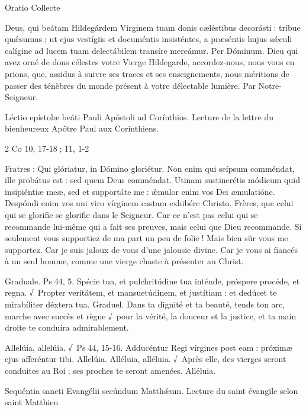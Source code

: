 \begin{paracol}{2}
Oratio
\switchcolumn
Collecte
\switchcolumn*

Deus, qui beátam Hildegárdem  Vírginem tuam donis cæléstibus decorásti : tríbue quǽsumus ; ut ejus vestígiis et documéntis insisténtes, a præséntis hujus sǽculi calígine ad lucem tuam delectábilem transíre mereámur. Per Dóminum.
\switchcolumn
Dieu qui avez orné de dons célestes  votre Vierge Hildegarde, accordez-nous, nous vous en prions, que, assidus à suivre ses traces et ses enseignements, nous méritions de passer des ténèbres du monde présent à votre délectable lumière. Par Notre-Seigneur.
\switchcolumn*

Léctio epístolæ beáti Pauli Apóstoli ad Corínthios.
\switchcolumn
Lecture de la lettre du bienheureux Apôtre Paul aux Corinthiens.
\switchcolumn*

2 Co 10, 17-18 ; 11, 1-2
\switchcolumn

\switchcolumn*

Fratres : Qui glóriatur, in Dómino  gloriétur. Non enim qui seípsum comméndat, ille probátus est : sed quem Deus comméndat. Utinam sustinerétis módicum quid insipiéntiæ meæ, sed et supportáte me : ǽmulor enim vos Dei æmulatióne. Despóndi enim vos uni viro vírginem castam exhibére Christo.
\switchcolumn
Frères, que celui qui se glorifie se glorifie  dans le Seigneur. Car ce n’est pas celui qui se recommande lui-même qui a fait ses preuves, mais celui que Dieu recommande. Si seulement vous supportiez de ma part un peu de folie ! Mais bien sûr vous me supportez. Car je suis jaloux de vous d’une jalousie divine. Car je vous ai fiancés à un seul homme, comme une vierge chaste à présenter au Christ.
\switchcolumn*

Graduale. Ps 44, 5. Spécie tua, et pulchritúdine tua inténde, próspere procéde, et regna. √~Propter veritátem, et mansuetúdinem, et justítiam : et dedúcet te mirabíliter déxtera tua.
\switchcolumn
Graduel. Dans ta dignité et ta beauté, tends ton arc, marche avec succès et règne √~pour la vérité, la douceur et la justice, et ta main droite te conduira admirablement.
\switchcolumn*

Allelúia, allelúia. √~Ps 44, 15-16. Adducéntur Regi vírgines post eam : próximæ ejus afferéntur tibi. Allelúia.
\switchcolumn
Alléluia, alléluia. √~Après elle, des vierges seront conduites au Roi ; ses proches te seront amenées. Alléluia.
\switchcolumn*

Sequéntia sancti Evangélii secúndum Matthǽum.
\switchcolumn
Lecture du saint évangile selon saint Matthieu
\switchcolumn*


\end{paracol}
